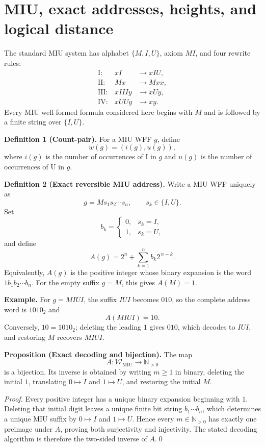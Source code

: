 \documentclass[11pt]{article}
\newcommand{\WMIU}{\mathcal W_{\mathrm{MIU}}}
\begin{document}
\section{MIU, exact addresses, heights, and logical distance}
The standard MIU system has alphabet $\{M,I,U\}$, axiom $MI$, and four rewrite rules:
\[
\begin{array}{rcl}
\mathrm{I}:&xI&\to xIU,\\
\mathrm{II}:&Mx&\to Mxx,\\
\mathrm{III}:&xIIIy&\to xUy,\\
\mathrm{IV}:&xUUy&\to xy.
\end{array}
\]
Every MIU well-formed formula considered here begins with $M$ and is followed by a finite string over $\{I,U\}$.

\textbf{Definition 1 (Count-pair).} For a MIU WFF $g$, define
\[
w(g)=(i(g),u(g)),
\]
where $i(g)$ is the number of occurrences of I in $g$ and $u(g)$ is the number of occurrences of U in $g$.

\textbf{Definition 2 (Exact reversible MIU address).} Write a MIU WFF uniquely as
\[
g=M s_1s_2\cdots s_n,\qquad s_k\in\{I,U\}.
\]
Set
\[
b_k=\begin{cases}0,&s_k=I,\\1,&s_k=U,\end{cases}
\]
and define
\[
\boxed{A(g)=2^n+\sum_{k=1}^{n} b_k2^{\,n-k}.}
\]
Equivalently, $A(g)$ is the positive integer whose binary expansion is the word $1b_1b_2\cdots b_n$. For the empty suffix $g=M$, this gives $A(M)=1$.

\textbf{Example.} For $g=MIUI$, the suffix $IUI$ becomes $010$, so the complete address word is $1010_2$ and
\[
A(MIUI)=10.
\]
Conversely, $10=1010_2$; deleting the leading $1$ gives $010$, which decodes to $IUI$, and restoring $M$ recovers $MIUI$.

\textbf{Proposition (Exact decoding and bijection).} The map
\[
A:\WMIU\longrightarrow\mathbb N_{>0}
\]
is a bijection. Its inverse is obtained by writing $m\ge1$ in binary, deleting the initial $1$, translating $0\mapsto I$ and $1\mapsto U$, and restoring the initial $M$.

\textit{Proof.} Every positive integer has a unique binary expansion beginning with $1$. Deleting that initial digit leaves a unique finite bit string $b_1\cdots b_n$, which determines a unique MIU suffix by $0\mapsto I$ and $1\mapsto U$. Hence every $m\in\mathbb N_{>0}$ has exactly one preimage under $A$, proving both surjectivity and injectivity. The stated decoding algorithm is therefore the two-sided inverse of $A$.\qed
\end{document}
